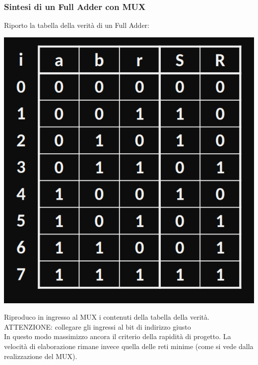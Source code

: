 \documentclass{article}
\begin{document}
\subsubsection*{Sintesi di un Full Adder con MUX}
Riporto la tabella della verità di un Full Adder:
\begin{center}
    \includegraphics[scale=0.27]{fulladderTdv.png}
\end{center}
Riproduco in ingresso al MUX i contenuti della tabella della verità.\\
ATTENZIONE: collegare gli ingressi al bit di indirizzo giusto\\
In questo modo massimizzo ancora il criterio della rapidità di progetto. La velocità di elaborazione rimane invece quella delle reti minime (come si vede dalla realizzazione del MUX).
\end{document}
